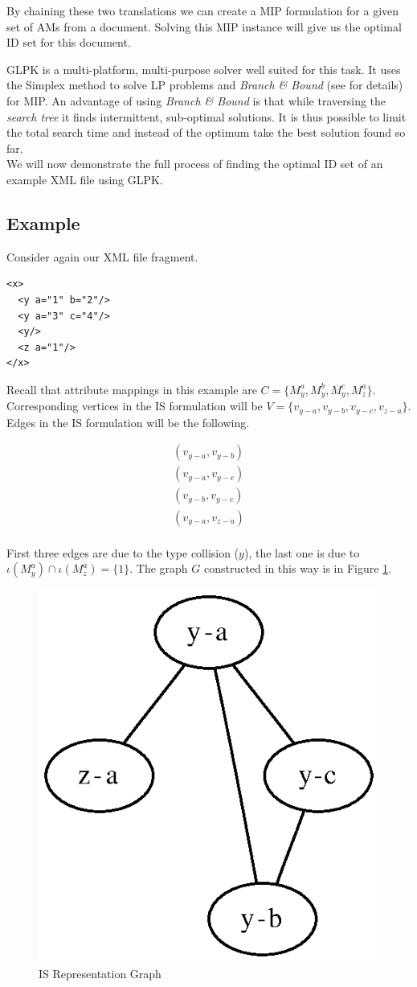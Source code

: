 By chaining these two translations we can create a MIP formulation for a given set of AMs from a document. Solving this MIP instance will give us the optimal ID set for this document.

GLPK \cite{glpk} is a multi-platform, multi-purpose solver well suited for this task. It uses the Simplex method to solve LP problems and \textit{Branch \& Bound} (see \cite{land60a} for details) for MIP. An advantage of using \textit{Branch \& Bound} is that while traversing the \textit{search tree} it finds intermittent, sub-optimal solutions. It is thus possible to limit the total search time and instead of the optimum take the best solution found so far.\\

We will now demonstrate the full process of finding the optimal ID set of an example XML file using GLPK.

\subsection{Example}

Consider again our XML file fragment.

\begin{verbatim}
<x>
  <y a="1" b="2"/>
  <y a="3" c="4"/>
  <y/>
  <z a="1"/>
</x>
\end{verbatim}

Recall that attribute mappings in this example are $C = \{M_{y}^{a}, M_{y}^{b}, M_{y}^{c}, M_{z}^{a}\}$. Corresponding vertices in the IS formulation will be $V = \{v_{y-a}, v_{y-b}, v_{y-c}, v_{z-a}\}$. Edges in the IS formulation will be the following.

\begin{eqnarray*}
(v_{y-a},v_{y-b}) \\
(v_{y-a},v_{y-c}) \\
(v_{y-b},v_{y-c}) \\
(v_{y-a},v_{z-a}) \\
\end{eqnarray*}

First three edges are due to the type collision ($y$), the last one is due to $\iota(M_{y}^{a}) \cap \iota(M_{z}^{a}) = \{1\}$. The graph $G$ constructed in this way is in Figure \ref{image-mip-is-graph}.

\begin{figure}
  \caption{IS Representation Graph}
  \label{image-mip-is-graph}
  \centering
	\includegraphics[width=.25\textwidth]{images/is-representation}
\end{figure}

